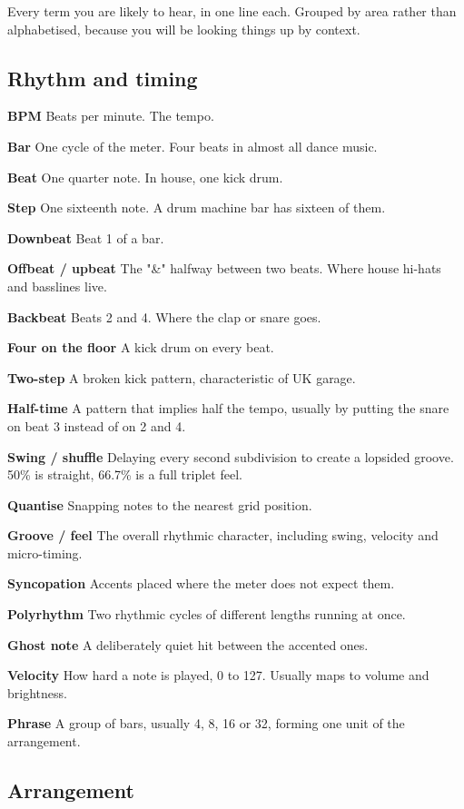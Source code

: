 Every term you are likely to hear, in one line each. Grouped by area rather than
alphabetised, because you will be looking things up by context.

\subsection{Rhythm and timing}\label{th09_glossary-rhythm-and-timing}

\textbf{BPM} Beats per minute. The tempo.

\textbf{Bar} One cycle of the meter. Four beats in almost all dance music.

\textbf{Beat} One quarter note. In house, one kick drum.

\textbf{Step} One sixteenth note. A drum machine bar has sixteen of them.

\textbf{Downbeat} Beat 1 of a bar.

\textbf{Offbeat / upbeat} The "\&" halfway between two beats. Where house hi-hats and basslines
live.

\textbf{Backbeat} Beats 2 and 4. Where the clap or snare goes.

\textbf{Four on the floor} A kick drum on every beat.

\textbf{Two-step} A broken kick pattern, characteristic of UK garage.

\textbf{Half-time} A pattern that implies half the tempo, usually by putting the snare on beat 3
instead of on 2 and 4.

\textbf{Swing / shuffle} Delaying every second subdivision to create a lopsided groove. 50\% is
straight, 66.7\% is a full triplet feel.

\textbf{Quantise} Snapping notes to the nearest grid position.

\textbf{Groove / feel} The overall rhythmic character, including swing, velocity and micro-timing.

\textbf{Syncopation} Accents placed where the meter does not expect them.

\textbf{Polyrhythm} Two rhythmic cycles of different lengths running at once.

\textbf{Ghost note} A deliberately quiet hit between the accented ones.

\textbf{Velocity} How hard a note is played, 0 to 127. Usually maps to volume and brightness.

\textbf{Phrase} A group of bars, usually 4, 8, 16 or 32, forming one unit of the arrangement.

\subsection{Arrangement}\label{th09_glossary-arrangement}

